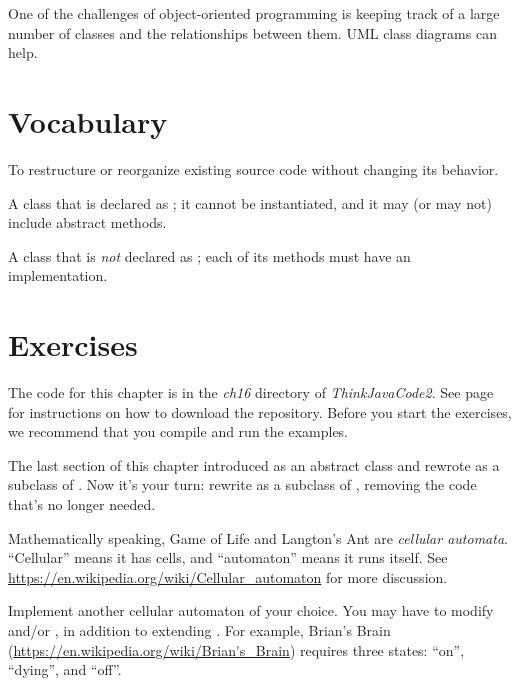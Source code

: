 

One of the challenges of object-oriented programming is keeping track of a large number of classes and the relationships between them.
UML class diagrams can help.


\section{Vocabulary}
\label{reusing-classes_vocabulary}

\begin{description}

To restructure or reorganize existing source code without changing its behavior.

A class that is declared as ; it cannot be instantiated, and it may (or may not) include abstract methods.

A class that is {\em not} declared as ; each of its methods must have an implementation.

\end{description}


\section{Exercises}
\label{reusing-classes_exercises}

The code for this chapter is in the {\it ch16} directory of {\it ThinkJavaCode2}.
See page~\pageref{code} for instructions on how to download the repository.
Before you start the exercises, we recommend that you compile and run the examples.

\begin{exercise}

The last section of this chapter introduced  as an abstract class and rewrote  as a subclass of .
Now it's your turn: rewrite  as a subclass of , removing the code that's no longer needed.

\end{exercise}


\begin{exercise}

Mathematically speaking, Game of Life and Langton's Ant are {\em cellular automata}.
``Cellular'' means it has cells, and ``automaton'' means it runs itself.
See \url{https://en.wikipedia.org/wiki/Cellular_automaton} for more discussion.

Implement another cellular automaton of your choice.
You may have to modify  and/or , in addition to extending .
For example, Brian's Brain (\url{https://en.wikipedia.org/wiki/Brian's_Brain}) requires three states: ``on'', ``dying'', and ``off''.

\end{exercise}
